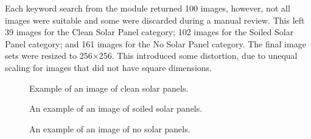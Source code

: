\documentclass[10pt,journal,compsoc]{IEEEtran}
\begin{document}
		Each keyword search from the module returned 100 images, however, not all images were suitable and some were discarded during a manual review. This left 39 images for the Clean Solar Panel category; 102 images for the Soiled Solar Panel category; and  161 images for the No Solar Panel category. The final image sets were resized to 256$\times$256. This introduced some distortion, due to unequal scaling for images that did not have square dimensions.
		\begin{figure}[h]
			\centering
			\caption{Example of an image of clean solar panels.}
		\end{figure}
		
		\begin{figure}[h]
			\centering
			\caption{An example of an image of soiled solar panels.}
		\end{figure}
		
		\begin{figure}[h]
			\centering
			\caption{An example of an image of no solar panels.}
		\end{figure}
		
\end{document}
